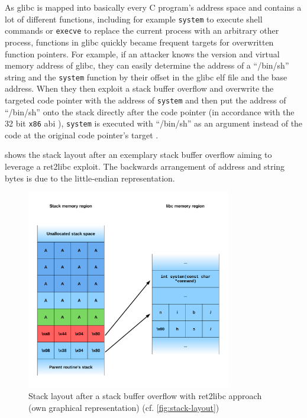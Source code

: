As \gls{glibc} is mapped into basically every C program's address space and contains a lot of different functions, including for example \texttt{system} to execute shell commands or \texttt{execve} to replace the current process with an arbitrary other process, functions in \gls{glibc} quickly became frequent targets for overwritten function pointers.
For example, if an attacker knows the version and virtual memory address of \gls{glibc}, they can easily determine the address of a ``/bin/sh'' string and the \texttt{system} function by their offset in the \gls{glibc} \gls{elf} file and the base address.
When they then exploit a stack buffer overflow and overwrite the targeted code pointer with the address of \texttt{system} and then put the address of ``/bin/sh'' onto the stack directly after the code pointer (in accordance with the 32 bit \texttt{x86} \gls{abi} \cites[11\psq]{Lu2015}[17\psqq]{Fog2019}), \texttt{system} is executed with ``/bin/sh'' as an argument instead of the code at the original code pointer's target \cite{SolarDesigner1997}.

 shows the stack layout after an exemplary stack buffer overflow aiming to leverage a \gls{ret2libc} exploit.
The backwards arrangement of address and string bytes is due to the little-endian representation.

\begin{figure}[htb]
	\centering
	\includegraphics[width=0.8\textwidth]{figures/ret2libc}
	\caption{Stack layout after a stack buffer overflow with \acs{ret2libc} approach (own graphical representation) (cf. \cref{fig:stack-layout})}
	\label{fig:ret2libc}
\end{figure}

